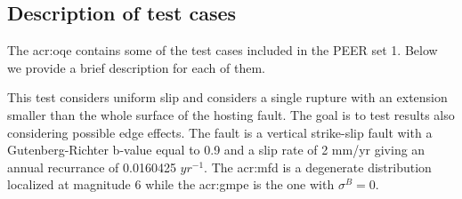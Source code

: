 \subsection{Description of test cases}
The \gls{acr:oqe} contains some of the test cases included in the PEER set 1.
Below we provide a brief description for each of them.
\begin{description}
    \clearpage
    \item [Test case 2] 
        This test considers uniform slip and considers a 
        single rupture with an extension smaller than the whole surface 
        of the hosting fault. The goal is to test results also considering
        possible edge effects. 
        The fault is a vertical strike-slip fault with a Gutenberg-Richter
        b-value equal to 0.9 and a slip rate of 2 mm/yr giving an annual 
        recurrance of 0.0160425 $yr^{-1}$. 
        The \gls{acr:mfd} is a degenerate distribution localized at 
        magnitude 6 while the \gls{acr:gmpe} is the \textcite{sadigh1997} 
        one with $\sigma^B=0$.


\end{description}
